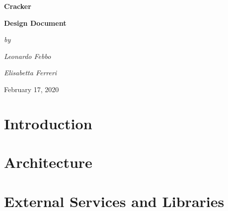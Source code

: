 \begin{titlepage}
\begin{center}
{\textbf{\Huge{Cracker}}}
\vspace{10mm}

{\textbf{\Large{Design Document}}}
\vspace{25mm}

{\slshape{\Large{by}}} 
\vspace{3mm}

{\slshape{\Large{Leonardo Febbo}}} 
\vspace{3mm}

{\slshape{\Large{Elisabetta Ferreri}}}

\vfill
{\large{February 17, 2020}}

\end{center}

\end{titlepage}

\setcounter{page}{2}


\newpage
{
	\hypersetup{linkcolor=black}
	\tableofcontents
}
\clearpage
{\section{Introduction}}
\label{sect:introduction}


\clearpage
{\section{Architecture}}
\label{sect:architecture}


\clearpage
{\section{External Services and Libraries}}
\label{sect:extservices}


